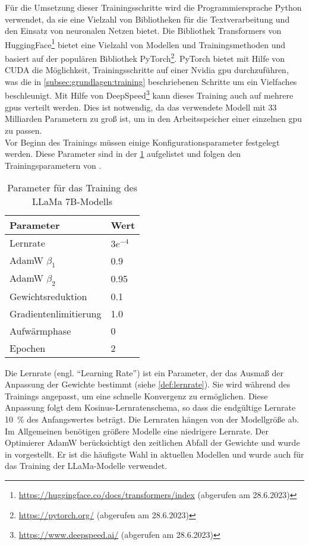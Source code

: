 Für die Umsetzung dieser Trainingsschritte wird die Programmiersprache Python verwendet, da sie eine Vielzahl von Bibliotheken für die Textverarbeitung und den Einsatz von neuronalen Netzen bietet.
Die Bibliothek Transformers von HuggingFace\footnote{\url{https://huggingface.co/docs/transformers/index} (abgerufen am 28.6.2023)} bietet eine Vielzahl von Modellen und Trainingsmethoden und basiert auf der populären Bibliothek PyTorch\footnote{\url{https://pytorch.org/} (abgerufen am 28.6.2023)}.
PyTorch bietet mit Hilfe von CUDA die Möglichkeit, Trainingsschritte auf einer Nvidia \ac{gpu} durchzuführen, was die in \cref{subsec:grundlagen:training} beschriebenen Schritte um ein Vielfaches beschleunigt.
Mit Hilfe von DeepSpeed\footnote{\url{https://www.deepspeed.ai/} (abgerufen am 28.6.2023)} kann dieses Training auch auf mehrere \ac{gpu}s verteilt werden.
Dies ist notwendig, da das verwendete Modell mit 33 Milliarden Parametern zu groß ist, um in den Arbeitsspeicher einer einzelnen \ac{gpu} zu passen.\\

Vor Beginn des Trainings müssen einige Konfigurationsparameter festgelegt werden.
Diese Parameter sind in der \cref{tab:training:parameter} aufgelistet und folgen den Trainingsparametern von \citet{llama}.\\
\begin{table}
    \centering
    \begin{tabular}{ll}
        \toprule
        \textbf{Parameter} & \textbf{Wert} \\
        \midrule
        Lernrate & $3e^{-4}$\\
        AdamW $\beta_1$ & \SI{0,9}{}\\
        AdamW $\beta_2$ & \SI{0,95}{}\\
        Gewichtsreduktion & \SI{0,1}{}\\
        Gradientenlimitierung & \SI{1,0}{}\\
        Aufwärmphase & 0\\
        Epochen & 2\\
        \bottomrule
    \end{tabular}
    \caption{Parameter für das Training des LLaMa 7B-Modells}\label{tab:training:parameter}
\end{table}

Die Lernrate (engl. \enquote{Learning Rate}) ist ein Parameter, der das Ausmaß der Anpassung der Gewichte bestimmt (siehe \cref{def:lernrate}).
Sie wird während des Trainings angepasst, um eine schnelle Konvergenz zu ermöglichen.
Diese Anpassung folgt dem Kosinus-Lernratenschema, so dass die endgültige Lernrate \SI{10}{\percent} des Anfangswertes beträgt.
Die Lernraten hängen von der Modellgröße ab.
Im Allgemeinen benötigen größere Modelle eine niedrigere Lernrate.
Der Optimierer AdamW berücksichtigt den zeitlichen Abfall der Gewichte und wurde in \citet{adamw} vorgestellt.
Er ist die häufigste Wahl in aktuellen Modellen und wurde auch für das Training der LLaMa-Modelle verwendet.\\

